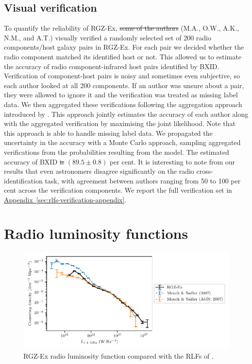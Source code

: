 \documentclass[11pt, a4paper]{book}
\newcommand{\aref}[1]{\hyperref[#1]{Appendix~\ref{#1}}}
\providecommand{\DIFaddtex}[1]{{\protect\color{blue}\uwave{#1}}} %
\providecommand{\DIFdeltex}[1]{{\protect\color{red}\sout{#1}}}                      %
\providecommand{\DIFaddbegin}{} %
\providecommand{\DIFaddend}{} %
\providecommand{\DIFdelbegin}{} %
\providecommand{\DIFdelend}{} %
\providecommand{\DIFadd}[1]{\texorpdfstring{\DIFaddtex{#1}}{#1}} %
\providecommand{\DIFdel}[1]{\texorpdfstring{\DIFdeltex{#1}}{}} %
\newcommand{\DIFscaledelfig}{0.5}
\newlength{\DIFdelgraphicswidth} %
\newlength{\DIFdelgraphicsheight} %
\newcommand{\DIFaddincludegraphics}[2][]{{\color{blue}\fbox{\DIFOincludegraphics[#1]{#2}}}} %
\newcommand{\DIFdelincludegraphics}[2][]{%
\sbox{\DIFdelgraphicsbox}{\DIFOincludegraphics[#1]{#2}}%
\settoboxwidth{\DIFdelgraphicswidth}{\DIFdelgraphicsbox} %
\settoboxtotalheight{\DIFdelgraphicsheight}{\DIFdelgraphicsbox} %
\scalebox{\DIFscaledelfig}{%
\parbox[b]{\DIFdelgraphicswidth}{\usebox{\DIFdelgraphicsbox}\\[-\baselineskip] \rule{\DIFdelgraphicswidth}{0em}}\llap{\resizebox{\DIFdelgraphicswidth}{\DIFdelgraphicsheight}{%
\setlength{\unitlength}{\DIFdelgraphicswidth}%
\begin{picture}(1,1)%
\thicklines\linethickness{2pt} %
{\color[rgb]{1,0,0}\put(0,0){\framebox(1,1){}}}%
{\color[rgb]{1,0,0}\put(0,0){\line( 1,1){1}}}%
{\color[rgb]{1,0,0}\put(0,1){\line(1,-1){1}}}%
\end{picture}%
}\hspace*{3pt}}} %
} %
\DeclareRobustCommand{\DIFaddbegin}{\DIFOaddbegin \let\includegraphics\DIFaddincludegraphics} %
\DeclareRobustCommand{\DIFaddend}{\DIFOaddend \let\includegraphics\DIFOincludegraphics} %
\DeclareRobustCommand{\DIFdelbegin}{\DIFOdelbegin \let\includegraphics\DIFdelincludegraphics} %
\DeclareRobustCommand{\DIFdelend}{\DIFOaddend \let\includegraphics\DIFOincludegraphics} %
\begin{document}
    \subsection{Visual verification}\label{sec:rlfs-manual-validation}

    To quantify the reliability of RGZ-Ex, \DIFdelbegin \DIFdel{some of the authors }\DIFdelend \DIFaddbegin \DIFadd{we }\DIFaddend (M.A., O.W., A.K., N.M., and A.T.) visually verified a randomly selected set of 200 radio components/host galaxy pairs in RGZ-Ex. For each pair we decided whether the radio component matched its identified host or not. This allowed us to estimate the accuracy of radio component-infrared host pairs identified by BXID. Verification of component-host pairs is noisy and sometimes even subjective, so each author looked at all 200 components. If an author was unsure about a pair, they were allowed to ignore it and the verification was treated as missing label data. We then aggregated these verifications following the aggregation approach introduced by \citet{dawid79em}. This approach jointly estimates the accuracy of each author along with the aggregated verification by maximising the joint likelihood. Note that this approach is able to handle missing label data. We propagated the uncertainty in the accuracy with a Monte Carlo approach, sampling aggregated verifications from the probabilities resulting from the \citeauthor{dawid79em} model. The estimated accuracy of BXID \DIFdelbegin \DIFdel{is }\DIFdelend \DIFaddbegin \DIFadd{was }\DIFaddend $(89.5 \pm 0.8)$ per cent. It is interesting to note from our results that even astronomers disagree significantly on the radio cross-identification task, with agreement between authors ranging from 50 to 100 per cent across the verification components. We report the full verification set in \DIFdelbegin %
\DIFdelend \DIFaddbegin \aref{sec:rlfs-verification-appendix}\DIFaddend .

\section{Radio luminosity functions}
\label{sec:rlfs-rlf}

  \begin{figure}
      \centering
    \includegraphics{rlf-images/rlf.pdf}
    \caption{RGZ-Ex radio luminosity function compared with the RLFs of \citet{mauch07rlf}.
      \label{fig:rlf}}
  \end{figure}
\end{document}
